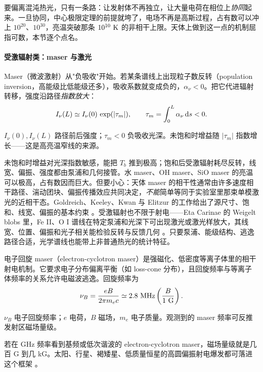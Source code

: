 要偏离混沌热光，只有一条路：让发射体不再独立，让大量电荷在相位上\emph{协同}起来。一旦协同，中心极限定理的前提就垮了，电场不再是高斯过程，占有数可以冲上 \(10^{20}\)、\(10^{30}\)，亮温突破那条 \(10^{10}~{\rm K}\) 的非相干上限。天体上做到这一点的机制屈指可数，本节逐个点名。

\paragraph{受激辐射类：maser 与激光}
\label{sec:e16-maser}

Maser（微波激射）从"负吸收"开始。若某条谱线上出现粒子数反转（population inversion，高能级比低能级还多），吸收系数就变成负的，\(\alpha_\nu<0\)。把它代进辐射转移，强度沿路径\emph{指数放大}：
\begin{equation}
  I_\nu(L)\simeq I_\nu(0)\,\exp(|\tau_m|),
  \qquad
  \tau_m=\int_0^L\alpha_\nu\,{\rm d}s<0 .
  \label{eq:e16-maser-gain}
\end{equation}
\begin{formulaexplain}
\(I_\nu(0),I_\nu(L)\) 路径前后强度；\(\tau_m<0\) 负吸收光深。未饱和时增益随 \(|\tau_m|\) 指数增长——这是高亮温窄线的来源。
\end{formulaexplain}
未饱和时增益对光深指数敏感，能把 \(T_b\) 推到极高；饱和后受激辐射耗尽反转，线宽、偏振、强度都由泵浦和几何接管。水 maser、OH maser、SiO maser 的亮温可以极高，占有数因而巨大。但要小心：天体 maser 的相干性通常由许多速度相干路径、湍动团块、偏振传播效应共同决定，\emph{不能}简单等同于实验室里那束单模激光的近相干态。Goldreich、Keeley、Kwan 与 Elitzur 的工作给出了源尺寸、饱和、线宽、偏振的基本约束 \citep{1972ApJ...174..517G,1973ApJ...179..111G,1974ApJ...190...27G,1982RvMP...54.1225E,1992ARA&A..30...75E}。受激辐射也不限于射电——Eta Carinae 的 Weigelt blobs 里，Fe II、O I 谱线在特定泵浦和光深下可出现激光或激光样放大，其线宽、位置、偏振和光子相关能检验反转与反馈几何 \citep{2004A&A...428..497J,2005NewA...10..361J,2008AIPC..984..216D}。只要泵浦、能级结构、逃逸路径合适，光学谱线也能带上非普通热光的统计特征。

电子回旋 maser（electron-cyclotron maser）是强磁化、低密度等离子体里的相干射电机制。它要求电子分布偏离平衡（如 loss-cone 分布），且回旋频率与等离子体频率的关系允许电磁波逃逸。回旋频率为
\begin{equation}
  \nu_B=\frac{eB}{2\pi m_ec}
       \simeq2.8~{\rm MHz}\left(\frac{B}{1~{\rm G}}\right).
  \label{eq:e16-cyclotron-frequency}
\end{equation}
\begin{formulaexplain}
\(\nu_B\) 电子回旋频率；\(e\) 电荷，\(B\) 磁场，\(m_e\) 电子质量。观测到的 maser 频率可反推发射区磁场量级。
\end{formulaexplain}
若在 GHz 频率看到基频或低次谐波的 electron-cyclotron maser，磁场量级就是几百 G 到几 kG。太阳、行星、褐矮星、低质量恒星的高圆偏振射电爆发都可落进这个框架 \citep{1982ApJ...259..844M,2006A&ARv..13..229T,2008ApJ...684..644H,1985ARA&A..23..169D}。

